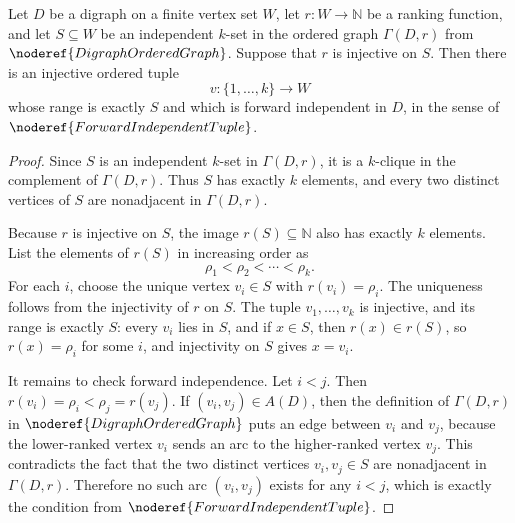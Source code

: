 \begin{helper}
Let \(D\) be a digraph on a finite vertex set \(W\), let \(r:W\to\mathbb N\) be a ranking function, and let \(S\subseteq W\) be an independent \(k\)-set in the ordered graph \(\Gamma(D,r)\) from \(\noderef{DigraphOrderedGraph}\). Suppose that \(r\) is injective on \(S\). Then there is an injective ordered tuple
\[
  v:\{1,\ldots,k\}\to W
\]
whose range is exactly \(S\) and which is forward independent in \(D\), in the sense of \(\noderef{ForwardIndependentTuple}\).
\end{helper}
\begin{proof}
Since \(S\) is an independent \(k\)-set in \(\Gamma(D,r)\), it is a \(k\)-clique in the complement of \(\Gamma(D,r)\). Thus \(S\) has exactly \(k\) elements, and every two distinct vertices of \(S\) are nonadjacent in \(\Gamma(D,r)\).

Because \(r\) is injective on \(S\), the image \(r(S)\subseteq\mathbb N\) also has exactly \(k\) elements. List the elements of \(r(S)\) in increasing order as
\[
  \rho_1<\rho_2<\cdots<\rho_k .
\]
For each \(i\), choose the unique vertex \(v_i\in S\) with \(r(v_i)=\rho_i\). The uniqueness follows from the injectivity of \(r\) on \(S\). The tuple \(v_1,\ldots,v_k\) is injective, and its range is exactly \(S\): every \(v_i\) lies in \(S\), and if \(x\in S\), then \(r(x)\in r(S)\), so \(r(x)=\rho_i\) for some \(i\), and injectivity on \(S\) gives \(x=v_i\).

It remains to check forward independence. Let \(i<j\). Then \(r(v_i)=\rho_i<\rho_j=r(v_j)\). If \((v_i,v_j)\in A(D)\), then the definition of \(\Gamma(D,r)\) in \(\noderef{DigraphOrderedGraph}\) puts an edge between \(v_i\) and \(v_j\), because the lower-ranked vertex \(v_i\) sends an arc to the higher-ranked vertex \(v_j\). This contradicts the fact that the two distinct vertices \(v_i,v_j\in S\) are nonadjacent in \(\Gamma(D,r)\). Therefore no such arc \((v_i,v_j)\) exists for any \(i<j\), which is exactly the condition from \(\noderef{ForwardIndependentTuple}\).
\end{proof}
